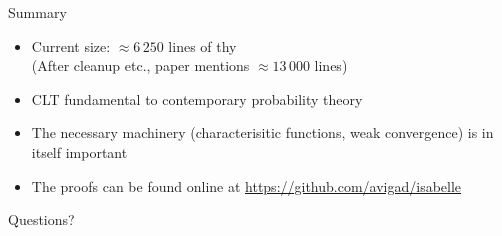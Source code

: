 \documentclass[usepdftitle=false]{beamer}
\begin{document}
\begin{frame}{Summary} %
\begin{itemize}

\item Current size: $\approx 6\,250$ lines of thy\\
  (After cleanup etc., paper mentions $\approx 13\,000$ lines)

\pause

\item CLT fundamental to contemporary probability theory

\pause

\item The necessary machinery (characterisitic functions, weak convergence) is in itself important

\item The proofs can be found online at \url{https://github.com/avigad/isabelle}

\end{itemize}


\begin{center} \LARGE Questions? \end{center}

\end{frame} %
\end{document}
